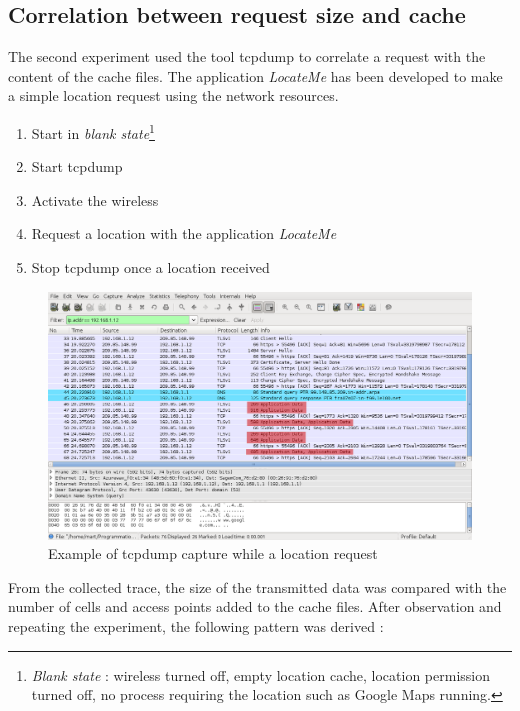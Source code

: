 \subsection{Correlation between request size and cache}

The second experiment used the tool tcpdump to correlate a request with the content of the cache files.
The application \emph{LocateMe} has been developed to make a simple location request using the network resources.

\begin{enumerate}
\item Start in \emph{blank state}\footnote{\emph{Blank state} : wireless turned off, empty location cache, location permission turned off, no process requiring the location such as Google Maps running.}
\item Start tcpdump
\item Activate the wireless
\item Request a location with the application \emph{LocateMe}
\item Stop tcpdump once a location received
\end{enumerate}

\begin{figure}[h]
  \hspace*{-2cm}
  \centering
  \includegraphics[width=17cm]{images/trace2.png}
  \caption{Example of tcpdump capture while a location request}
  \label{fig:loc-req-tcpdump}
\end{figure}

From the collected trace, the size of the transmitted data was compared with the number of cells and access points added to the cache files.
After observation and repeating the experiment, the following pattern was derived :

